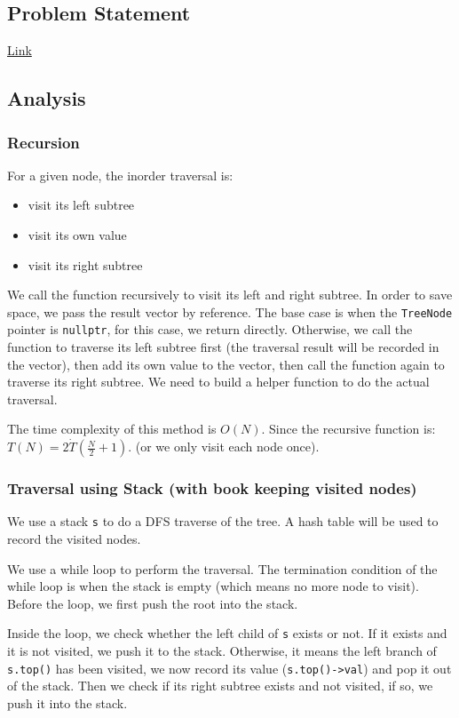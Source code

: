 \documentclass[11pt]{article}
\begin{document}
\subsection{Problem Statement}
\label{sec:orge8d5e0e}
\href{https://leetcode.com/problems/binary-tree-inorder-traversal/}{Link}
\subsection{Analysis}
\label{sec:orgf7ade67}
\subsubsection{Recursion}
\label{sec:org6ba1121}
For a given node, the inorder traversal is:
\begin{itemize}
\item visit its left subtree
\item visit its own value
\item visit its right subtree
\end{itemize}

We call the function recursively to visit its left and right subtree. In order to save space, we pass the result vector by reference. The base case is when the \texttt{TreeNode} pointer is \texttt{nullptr}, for this case, we return directly. Otherwise, we call the function to traverse its left subtree first (the traversal result will be recorded in the vector), then add its own value to the vector, then call the function again to traverse its right subtree. We need to build a helper function to do the actual traversal.

The time complexity of this method is \(O(N)\). Since the recursive function is: \(T(N) = 2\dot T(\frac{N}{2} + 1)\). (or we only visit each node once).
\subsubsection{Traversal using Stack (with book keeping visited nodes)}
\label{sec:org0fe4737}
We use a stack \texttt{s} to do a DFS traverse of the tree. A hash table will be used to record the visited nodes.

We use a while loop to perform the traversal. The termination condition of the while loop is when the stack is empty (which means no more node to visit). Before the loop, we first push the root into the stack.

Inside the loop, we check whether the left child of \texttt{s} exists or not. If it exists and it is not visited, we push it to the stack. Otherwise, it means the left branch of \texttt{s.top()} has been visited, we now record its value (\texttt{s.top()->val}) and pop it out of the stack. Then we check if its right subtree exists and not visited, if so, we push it into the stack.
\end{document}
